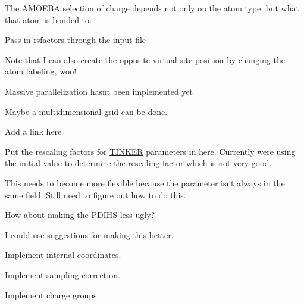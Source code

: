 \begin{DoxyRefList}
The A\+M\+O\+E\+BA selection of charge depends not only on the atom type, but what that atom is bonded to.  
\item[\label{todo__todo000006}%
\Hypertarget{todo__todo000006}%
Member \hyperlink{classsrc_1_1forcefield_1_1FF_a4524aae9e3644c578766a36f220ef076}{src.forcefield.FF.rsmake} (self, printfacs=True)]Pass in rsfactors through the input file 
\item[\label{todo__todo000010}%
\Hypertarget{todo__todo000010}%
Class \hyperlink{classsrc_1_1gmxio_1_1ITP__Reader}{src.gmxio.I\+T\+P\+\_\+\+Reader} ]Note that I can also create the opposite virtual site position by changing the atom labeling, woo! 
\item[\label{todo__todo000012}%
\Hypertarget{todo__todo000012}%
Member \hyperlink{classsrc_1_1optimizer_1_1Optimizer_a3948891ba042abccf4c6e111f3ce50be}{src.optimizer.Optimizer.Genetic\+Algorithm} (self)]Massive parallelization hasn\textquotesingle{}t been implemented yet 
\item[\label{todo__todo000013}%
\Hypertarget{todo__todo000013}%
Member \hyperlink{classsrc_1_1optimizer_1_1Optimizer_a98e20ccc6c2d2cf5f6c611a0441e14bb}{src.optimizer.Optimizer.Scan\+\_\+\+Values} (self, Math\+Phys=1)]Maybe a multidimensional grid can be done.  
\item[\label{todo__todo000015}%
\Hypertarget{todo__todo000015}%
Member \hyperlink{classsrc_1_1smirnoffio_1_1SMIRNOFF__Reader_ab3ceaf1974b7b1839ddaaa0cc3fc24b8}{src.smirnoffio.S\+M\+I\+R\+N\+O\+F\+F\+\_\+\+Reader.build\+\_\+pid} (self, element, parameter)]Add a link here  
\item[\label{todo__todo000016}%
\Hypertarget{todo__todo000016}%
Member \hyperlink{classsrc_1_1tinkerio_1_1Tinker__Reader_a456a3fad03449282241abbea4a866a42}{src.tinkerio.Tinker\+\_\+\+Reader.feed} (self, line)]Put the rescaling factors for \hyperlink{classsrc_1_1tinkerio_1_1TINKER}{T\+I\+N\+K\+ER} parameters in here. Currently we\textquotesingle{}re using the initial value to determine the rescaling factor which is not very good. 
\item[\label{todo__todo000009}%
\Hypertarget{todo__todo000009}%
Member \hyperlink{namespacesrc_1_1gmxio_ad55e036d51846e3440a373c57439dffa}{src\+:\+:gmxio.pdict} ]This needs to become more flexible because the parameter isn\textquotesingle{}t always in the same field. Still need to figure out how to do this. 

How about making the P\+D\+I\+HS less ugly?  
\item[\label{todo__todo000011}%
\Hypertarget{todo__todo000011}%
Member \hyperlink{namespacesrc_1_1nifty_a1adc158bdcdb57c642f95d5e015bc881}{src\+:\+:nifty.floatornan} (word)]I could use suggestions for making this better.  
\item[\label{todo__todo000014}%
\Hypertarget{todo__todo000014}%
Member \hyperlink{namespacesrc_1_1parser_a0931939fda05a56904977f2b4e1394d2}{src\+:\+:parser.parse\+\_\+inputs} (input\+\_\+file=None)]Implement internal coordinates. 

Implement sampling correction. 

Implement charge groups. 
\end{DoxyRefList}